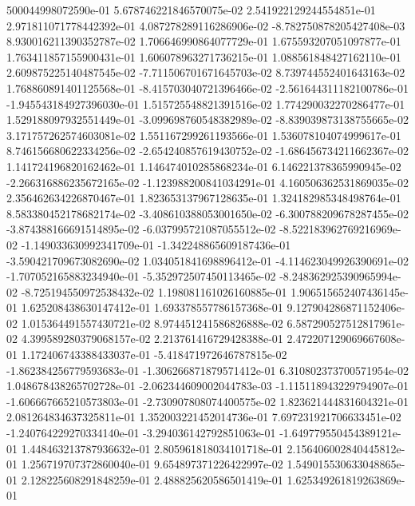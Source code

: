 500044998072590e-01	5.678746221846570075e-02	2.541922129244554851e-01	2.971811071778442392e-01	4.087278289116286906e-02	-8.782750878205427408e-03	8.930016211390352787e-02	1.706646990864077729e-01	1.675593207051097877e-01	1.763411857155900431e-01	1.606078963271736215e-01	1.088561848427162110e-01	2.609875225140487545e-02	-7.711506701671645703e-02	8.739744552401643163e-02	1.768860891401125568e-01	-8.415703040721396466e-02	-2.561644311182100786e-01	-1.945543184927396030e-01	1.515725548821391516e-02	1.774290032270286477e-01	1.529188097932551449e-01	-3.099698760548382989e-02	-8.839039873138755665e-02	3.171757262574603081e-02	1.551167299261193566e-01	1.536078104074999617e-01	8.746156680622334256e-02	-2.654240857619430752e-02	-1.686456734211662367e-02	1.141724196820162462e-01	1.146474010285868234e-01	6.146221378365990945e-02	-2.266316886235672165e-02	-1.123988200841034291e-01	4.160506362531869035e-02	2.356462634226870467e-01	1.823653137967128635e-01	1.324182985348498764e-01	8.583380452178682174e-02	-3.408610388053001650e-02	-6.300788209678287455e-02	-3.874388166691514895e-02	-6.037995721087055512e-02	-8.522183962769216969e-02	-1.149033630992341709e-01	-1.342248865609187436e-01	-3.590421709673082690e-02	1.034051841698896412e-01	-4.114623049926390691e-02	-1.707052165883234940e-01	-5.352972507450113465e-02	-8.248362925390965994e-02	-8.725194550972538432e-02	1.198081161026160885e-01	1.906515652407436145e-01	1.625208438630147412e-01	1.693378557786157368e-01	9.127904286871152406e-02	1.015364491557430721e-02	8.974451241586826888e-02	6.587290527512817961e-02	4.399589280379068157e-02	2.213761416729428388e-01	2.472207129069667608e-01	1.172406743388433037e-01	-5.418471972646787815e-02	-1.862384256779593683e-01	-1.306266871879571412e-01	6.310802373700571954e-02	1.048678438265702728e-01	-2.062344609002044783e-03	-1.115118943229794907e-01	-1.606667665210573803e-01	-2.730907808074400575e-02	1.823621444831604321e-01	2.081264834637325811e-01	1.352003221452014736e-01	7.697231921706633451e-02	-1.240764229270334140e-01	-3.294036142792851063e-01	-1.649779550454389121e-01	1.448463213787936632e-01	2.805961818034101718e-01	2.156406002840445812e-01	1.256719707372860040e-01	9.654897371226422997e-02	1.549015530633048865e-01	2.128225608291848259e-01	2.488825620586501419e-01	1.625349261819263869e-01
